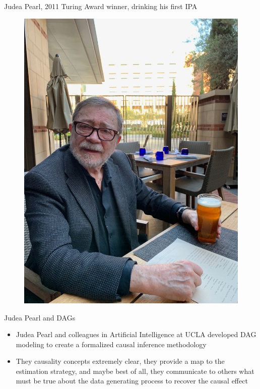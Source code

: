 \documentclass{beamer}
\begin{document}
\begin{frame}{Judea Pearl, 2011 Turing Award winner, drinking his first IPA}

  \begin{figure}
    \includegraphics[scale=0.05]{./lecture_includes/pearl_ipa.jpg}
  \end{figure}

\end{frame}


\begin{frame}{Judea Pearl and DAGs}


  \begin{itemize}
    \item Judea Pearl and colleagues in Artificial Intelligence at UCLA developed DAG modeling to create a formalized causal inference methodology
    \item They causality concepts extremely clear, they provide a map to the estimation strategy, and maybe best of all, they communicate to others what must be true about the data generating process to recover the causal effect
  \end{itemize}

\end{frame}
\end{document}
